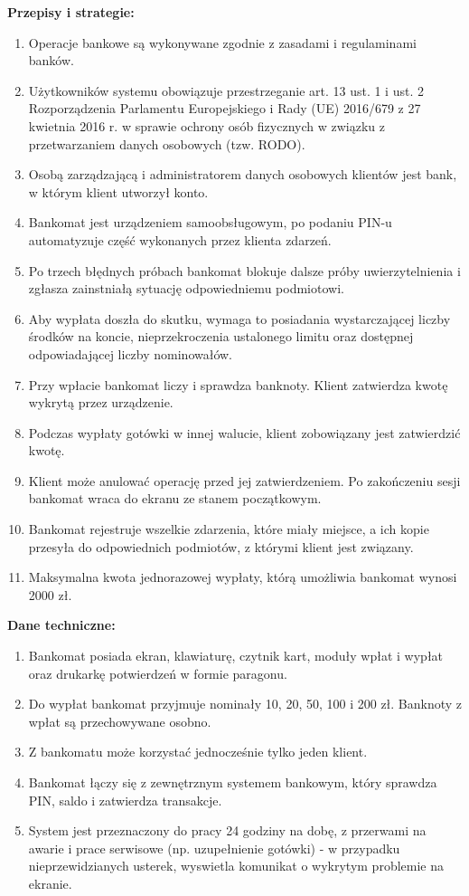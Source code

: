 \documentclass[10pt,a4paper]{article}
\begin{document}
\medskip
\noindent\textbf{Przepisy i strategie:}

\begin{enumerate}
    \item Operacje bankowe są wykonywane zgodnie z zasadami i regulaminami banków.
    \item Użytkowników systemu obowiązuje przestrzeganie art. 13 ust. 1 i ust. 2 Rozporządzenia Parlamentu Europejskiego
    i Rady (UE) 2016/679 z 27 kwietnia 2016 r. w sprawie ochrony osób fizycznych w związku z przetwarzaniem danych
    osobowych (tzw. RODO).
    \item Osobą zarządzającą i administratorem danych osobowych klientów jest bank, w którym klient utworzył konto.
    \item Bankomat jest urządzeniem samoobsługowym, po podaniu PIN-u automatyzuje część wykonanych przez klienta zdarzeń.
    \item Po trzech błędnych próbach bankomat blokuje dalsze próby uwierzytelnienia i zgłasza zainstniałą sytuację odpowiedniemu podmiotowi.
    \item Aby wypłata doszła do skutku, wymaga to posiadania wystarczającej liczby środków na koncie, nieprzekroczenia ustalonego limitu oraz dostępnej odpowiadającej liczby nominowałów.
    \item Przy wpłacie bankomat liczy i sprawdza banknoty. Klient zatwierdza kwotę wykrytą przez urządzenie.
    \item Podczas wypłaty gotówki w innej walucie, klient zobowiązany jest zatwierdzić kwotę.
    \item Klient może anulować operację przed jej zatwierdzeniem. Po zakończeniu sesji bankomat wraca do ekranu ze stanem początkowym.
    \item Bankomat rejestruje wszelkie zdarzenia, które miały miejsce, a ich kopie przesyła do odpowiednich podmiotów, z którymi klient jest związany.
    \item Maksymalna kwota jednorazowej wypłaty, którą umożliwia bankomat wynosi 2000 zł.
\end{enumerate}

\medskip
\noindent\textbf{Dane techniczne:}

\begin{enumerate}
    \item Bankomat posiada ekran, klawiaturę, czytnik kart, moduły wpłat i wypłat oraz drukarkę potwierdzeń w formie paragonu.
    \item Do wypłat bankomat przyjmuje nominały 10, 20, 50, 100 i 200 zł. Banknoty z wpłat są przechowywane osobno.
    \item Z bankomatu może korzystać jednocześnie tylko jeden klient.
    \item Bankomat łączy się z zewnętrznym systemem bankowym, który sprawdza PIN, saldo i zatwierdza transakcje.
    \item System jest przeznaczony do pracy 24 godziny na dobę, z przerwami na awarie i prace serwisowe (np. uzupełnienie gotówki) - w przypadku nieprzewidzianych usterek, wyswietla komunikat o wykrytym problemie na ekranie.
    
\end{enumerate}
\newpage
\end{document}

